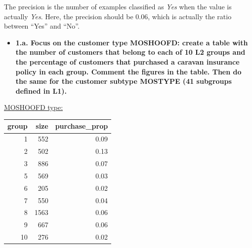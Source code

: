 \documentclass[
  12pt,
  oneside]{report}
\newenvironment{Shaded}{\begin{snugshade}}{\end{snugshade}}
\newcommand{\DataTypeTok}[1]{\textcolor[rgb]{0.13,0.29,0.53}{#1}}
\newcommand{\DecValTok}[1]{\textcolor[rgb]{0.00,0.00,0.81}{#1}}
\newcommand{\KeywordTok}[1]{\textcolor[rgb]{0.13,0.29,0.53}{\textbf{#1}}}
\newcommand{\NormalTok}[1]{#1}
\newcommand{\OperatorTok}[1]{\textcolor[rgb]{0.81,0.36,0.00}{\textbf{#1}}}
\newcommand{\StringTok}[1]{\textcolor[rgb]{0.31,0.60,0.02}{#1}}
\providecommand{\tightlist}{%
  \setlength{\itemsep}{0pt}\setlength{\parskip}{0pt}}
\begin{document}
The precision is the number of examples classified as \emph{Yes} when the value is actually \emph{Yes}. Here, the precision should be 0.06, which is actually the ratio between \enquote{Yes} and \enquote{No}.

\begin{itemize}
\tightlist
\item
  \textbf{1.a. Focus on the customer type MOSHOOFD: create a table with the number of customers that belong to each of 10 L2 groups and the percentage of customers that purchased a caravan insurance policy in each group. Comment the figures in the table. Then do the same for the customer subtype MOSTYPE (41 subgroups defined in L1).}
\end{itemize}

\underline{MOSHOOFD type:}

\begin{Shaded}
\end{Shaded}

\begin{tabular}{r|r|r}
\hline
group & size & purchase\_prop\\
\hline
1 & 552 & 0.09\\
\hline
2 & 502 & 0.13\\
\hline
3 & 886 & 0.07\\
\hline
5 & 569 & 0.03\\
\hline
6 & 205 & 0.02\\
\hline
7 & 550 & 0.04\\
\hline
8 & 1563 & 0.06\\
\hline
9 & 667 & 0.06\\
\hline
10 & 276 & 0.02\\
\hline
\end{tabular}
\end{document}
